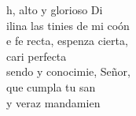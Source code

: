 \begin{cancion}%
	h, alto y glorioso Di\\
	ilina las tinies de mi coón\\
	e fe recta, espenza cierta,\\
	cari perfecta\\
	sendo y conocimie, Señor,\\
	 que cumpla tu san \\
	y veraz mandamien \\
\end{cancion}%
